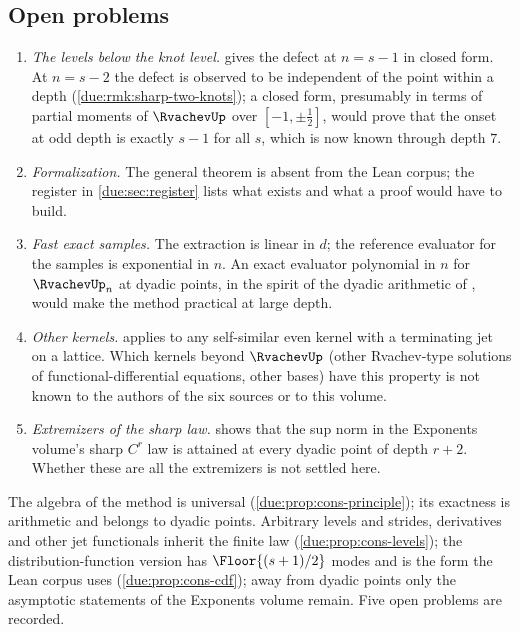 \documentclass[11pt,oneside]{article}
\theoremstyle{plain}
\theoremstyle{definition}
\theoremstyle{remark}
\newcommand{\upn}[1]{\RvachevUp_{#1}}
\begin{document}
\subsection{Open problems}
\label{due:sec:cons-open}

\begin{enumerate}[label=\textup{(O\arabic*)}]
\item\label{due:it:open-two-knots}
 \emph{The levels below the knot level.}  
 gives the defect at $n=s-1$ in closed form.  At $n=s-2$ the defect is
 observed to be independent of the point within a depth
 (\cref{due:rmk:sharp-two-knots}); a closed form, presumably in terms of
 partial moments of $\RvachevUp$ over $[-1,\pm\tfrac12]$, would prove that
 the onset at odd depth is exactly $s-1$ for all $s$, which is now known
 through depth $7$.
\item\label{due:it:open-lean}
 \emph{Formalization.}  The general theorem is absent from the Lean corpus;
 the register in \cref{due:sec:register} lists what exists and what a
 proof would have to build.
\item\label{due:it:open-fast}
 \emph{Fast exact samples.}  The extraction is linear in $d$; the
 reference evaluator for the samples is exponential in $n$.  An exact
 evaluator polynomial in $n$ for $\upn{n}$ at dyadic points, in the spirit
 of the dyadic arithmetic of \cite{arias2018}, would make the method
 practical at large depth.
\item\label{due:it:open-bases}
 \emph{Other kernels.}   applies to any
 self-similar even kernel with a terminating jet on a lattice.  Which
 kernels beyond $\RvachevUp$ (other Rvachev-type solutions of
 functional-differential equations, other bases) have this property is
 not known to the authors of the six sources or to this volume.
\item\label{due:it:open-extremizers}
 \emph{Extremizers of the sharp law.}  
 shows that the sup norm in the Exponents volume's sharp $C^{r}$ law is
 attained at every dyadic point of depth $r+2$.  Whether these are all the
 extremizers is not settled here.
\end{enumerate}

\begin{summarybox}[title={Section summary}]
The algebra of the method is universal (\cref{due:prop:cons-principle});
its exactness is arithmetic and belongs to dyadic points.  Arbitrary
levels and strides, derivatives and other jet functionals inherit the
finite law (\cref{due:prop:cons-levels}); the distribution-function
version has $\Floor{(s+1)/2}$ modes and is the form the Lean corpus uses
(\cref{due:prop:cons-cdf}); away from dyadic points only the asymptotic
statements of the Exponents volume remain.  Five open problems are
recorded.
\end{summarybox}
\end{document}
